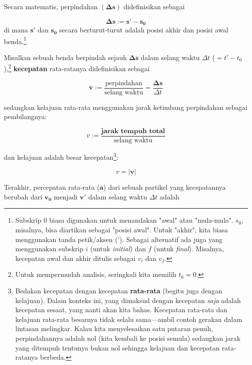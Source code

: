 \documentclass[12pt, a4paper]{article}\usepackage[utf8]{inputenc}
\theoremstyle{plain}
\theoremstyle{plain}
\numberwithin{equation}{section}
\theoremstyle{definition}
\begin{document}
	
	Secara matematis, perpindahan $(\boldsymbol{\Delta s})$ didefinisikan sebagai
	
	\begin{equation}
		\boldsymbol{\Delta s} := \boldsymbol{s'} - \boldsymbol{s_0} 
	\end{equation} 
	di mana $\boldsymbol{s'}$ dan $\boldsymbol{s_0}$ secara berturut-turut adalah posisi akhir dan posisi awal benda.\footnote{Subskrip $0$ biasa digunakan untuk menandakan "awal" atau "mula-mula". $s_0$, misalnya, bisa diartikan sebagai "posisi awal". Untuk "akhir", kita biasa menggunakan tanda petik/aksen ('). Sebagai alternatif ada juga yang menggunakan subskrip $i$ (untuk \emph{initial}) dan $f$ (untuk \emph{final}). Misalnya, kecepatan awal dan akhir ditulis sebagai $v_i$ dan $v_f$.}
	
	\par
	Misalkan sebuah benda berpindah sejauh $\boldsymbol{\Delta s}$ dalam selang waktu $\Delta t$ ($= t' - t_0$),\footnote{Untuk mempermudah analisis, seringkali kita memilih $t_0 = 0$.} \textbf{kecepatan} rata-ratanya didefinisikan sebagai
	
	\begin{equation}
		\boldsymbol{\overline{v}} := \frac{\text{perpindahan}}{\text{selang waktu}} = \frac{\boldsymbol{\Delta s}}{\Delta t}
	\end{equation}
	
	sedangkan kelajuan rata-rata menggunakan jarak ketimbang perpindahan sebagai pembilangnya:
	
	\begin{equation}
		\overline{v} := \frac{\textbf{jarak tempuh total}}{\text{selang waktu}}
	\end{equation}
	
	dan kelajuan adalah besar kecepatan\footnote{Bedakan kecepatan dengan kecepatan \textbf{rata-rata} (begitu juga dengan kelajuan). Dalam konteks ini, yang dimaksud dengan kecepatan \emph{saja} adalah kecepatan sesaat, yang nanti akan kita bahas. Kecepatan rata-rata dan kelajuan rata-rata besarnya tidak selalu sama---ambil contoh gerakan dalam lintasan melingkar. Kalau kita menyelesaikan satu putaran penuh, perpindahannya adalah nol (kita kembali ke posisi semula) sedangkan jarak yang ditempuh tentunya bukan nol sehingga kelajuan dan kecepatan rata-ratanya berbeda.}:
	
	\begin{equation}
		v = |\boldsymbol{v}|
	\end{equation}
	
	Terakhir, percepatan rata-rata ($\boldsymbol{\overline{a}}$) dari sebuah partikel yang kecepatannya berubah dari $\boldsymbol{v_0}$ menjadi $\boldsymbol{v'}$ dalam selang waktu $\Delta t$ adalah
	
\end{document}

